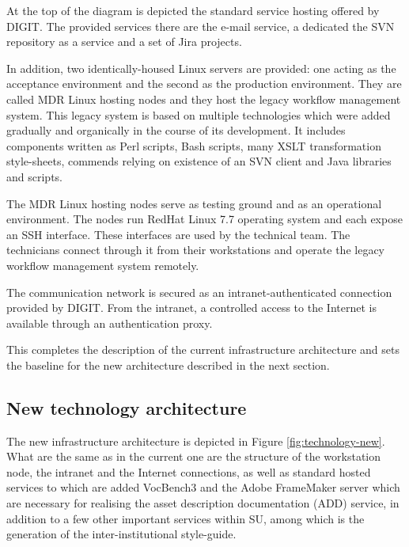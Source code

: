 	At the top of the diagram is depicted the standard service hosting offered by DIGIT. The provided services there are the e-mail service, a dedicated the SVN repository as a service and a set of Jira projects.
	
	In addition, two identically-housed Linux servers are provided: one acting as the acceptance environment and the second as the production environment. They are called MDR Linux hosting nodes and they host the legacy workflow management system. This legacy system is based on multiple technologies which were added gradually and organically in the course of its development. It includes components written as Perl scripts, Bash scripts, many XSLT transformation style-sheets, commends relying on existence of an SVN client and Java libraries and scripts.
		
	The MDR Linux hosting nodes serve as testing ground and as an operational environment. The nodes run RedHat Linux 7.7 operating system and each expose an SSH interface. These interfaces are used by the technical team. The technicians connect through it from their workstations and operate the legacy workflow management system remotely.
	
	The communication network is secured as an intranet-authenticated connection provided by DIGIT. From the intranet, a controlled access to the Internet is available through an authentication proxy. 
	
	This completes the description of the current infrastructure architecture and sets the baseline for the new architecture described in the next section.
	
	\subsection{New technology architecture}
	\label{sec:technology-new}
	
	The new infrastructure architecture is depicted in Figure \ref{fig:technology-new}. What are the same as in the current one are the structure of the workstation node, the intranet and the Internet connections, as well as standard hosted services to which are added VocBench3 and the Adobe FrameMaker server which are necessary for realising the asset description documentation (ADD) service, in addition to a few other important services within SU, among which is the generation of the inter-institutional style-guide. 
	
